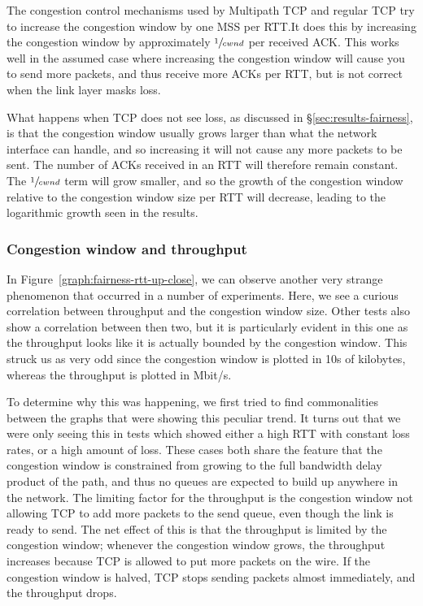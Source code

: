 The congestion control mechanisms used by Multipath TCP and regular TCP try to
increase the congestion window by one MSS per RTT.\@ It does this by increasing
the congestion window by approximately $\sfrac{1}{cwnd}$ per received ACK.\@
This works well in the assumed case where increasing the congestion window will
cause you to send more packets, and thus receive more ACKs per RTT, but is not
correct when the link layer masks loss.

What happens when TCP does not see loss, as discussed in 
\S\ref{sec:results-fairness}, is %
that the congestion window usually grows larger than what the network interface 
can handle, and so increasing it will not cause any more packets to be sent. 
The number of ACKs received in an RTT will therefore remain constant. The 
$\sfrac{1}{cwnd}$ term will grow smaller, and so the growth of the congestion 
window relative to the congestion window size per RTT will decrease, leading to 
the logarithmic growth seen in the results.

\subsubsection{Congestion window and throughput}

In Figure~\ref{graph:fairness-rtt-up-close}, we can observe another very strange
phenomenon that occurred in a number of experiments. Here, we see a curious
correlation between throughput and the congestion window size. Other tests also
show a correlation between then two, but it is particularly evident in this one
as the throughput looks like it is actually bounded by the congestion window.
This struck us as very odd since the congestion window is plotted in 10s of
kilobytes, whereas the throughput is plotted in Mbit/s.

To determine why this was happening, we first tried to find commonalities
between the graphs that were showing this peculiar trend. It turns out that we
were only seeing this in tests which showed either a high RTT with constant loss
rates, or a high amount of loss. These cases both share the feature that the
congestion window is constrained from growing to the full bandwidth delay
product of the path, and thus no queues are expected to build up anywhere in the
network. The limiting factor for the throughput is the congestion window not
allowing TCP to add more packets to the send queue, even though the link is
ready to send. The net effect of this is that the throughput is limited by the
congestion window; whenever the congestion window grows, the throughput
increases because TCP is allowed to put more packets on the wire. If the
congestion window is halved, TCP stops sending packets almost immediately, and
the throughput drops.

